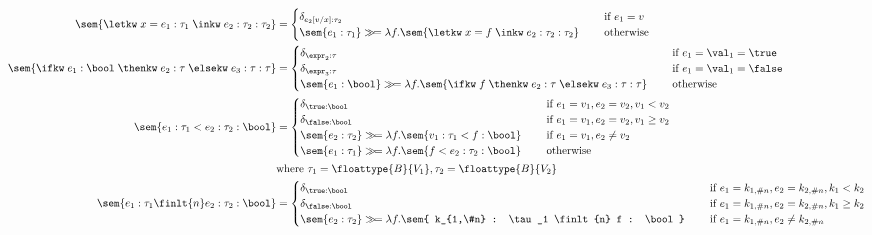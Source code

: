 {
\footnotesize
\allowdisplaybreaks
\begin{align*}
	\sem{ \letkw \; x = e_1 : \tau_1 \; \inkw \; e_2 : \tau_2 : \tau_2} &= \begin{cases}
		\delta_{e_2[v/x] : \tau_2} \quad &\text{ if } e_1 = v \\
		\sem{ e_1 : \tau_1 } \gg\!= \lambda f. \sem{ \letkw \; x = f \; \inkw \; e_2 : \tau_2 : \tau_2} \quad &\text{ otherwise } \\
	\end{cases} \\
	\sem{ \ifkw \; e_1 : \bool \; \thenkw \; e_2 : \tau \; \elsekw \; e_3 : \tau : \tau} &= \begin{cases}
		\delta_{\expr_2 : \tau}  \quad &\text{ if $e_1 = \val_1 = \true$} \\
		\delta_{\expr_3 : \tau}  \quad &\text{ if $e_1 = \val_1 = \false$} \\
		\sem{ e_1 : \bool} \gg\!= \lambda f. \sem{ \ifkw \; f \; \thenkw \; e_2 : \tau \; \elsekw \; e_3 : \tau : \tau} \quad &\text{ otherwise } \\
	\end{cases} \\
	\sem{ e_1 : \tau_1 < e_2 : \tau_2 : \bool} &= \begin{cases}
		\delta_{\true : \bool} \quad &\text{ if } e_1 = v_1, e_2 = v_2, v_1 < v_2 \\
		\delta_{\false : \bool} \quad &\text{ if } e_1 = v_1, e_2 = v_2, v_1 \geq v_2 \\
		\sem{ e_2 : \tau_2 } \gg\!= \lambda f. \sem{ v_1 : \tau_1 < f : \bool} \quad &\text{ if } e_1 = v_1, e_2 \neq v_2 \\
		\sem{ e_1 : \tau_1 } \gg\!= \lambda f. \sem{ f < e_2 : \tau_2 : \bool} \quad &\text{ otherwise } \\
	\end{cases} \\
	&\text{where } \tau_1 = \floattype{B}{V_1}, \tau_2 = \floattype{B}{V_2} \\
	\sem{ e_1 : \tau_1 \finlt{n} e_2 : \tau_2 : \bool} &= \begin{cases}
		\delta_{\true : \bool} \quad &\text{ if } e_1 = k_{1,\#n}, e_2 = k_{2,\#n}, k_1 < k_2 \\
		\delta_{\false : \bool} \quad &\text{ if } e_1 = k_{1,\#n}, e_2 = k_{2,\#n}, k_1 \geq k_2 \\
		\sem{ e_2 : \tau_2 } \gg\!= \lambda f. \sem{ k_{1,\#n} : \tau_1 \finlt{n} f : \bool} \quad &\text{ if } e_1 = k_{1,\#n}, e_2 \neq k_{2,\#n} \\

\end{cases}
\end{align*}}
